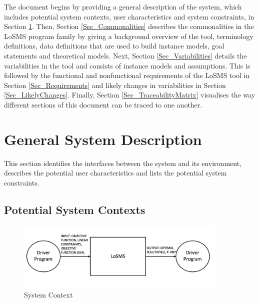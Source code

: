 \documentclass[12pt]{article}
\newcommand{\famname}{LoSMS} %
\begin{document}
The document begins by providing a general description of the system, which 
includes potential system contexts, user characteristics and system 
constraints, in Section \ref{SecSystemDescription}. Then, Section 
\ref{Sec_Commonalities} describes the commonalities in the \famname{} program 
family by giving a background overview of the tool, terminology definitions, 
data definitions that are used to build instance models, goal statements and 
theoretical models. Next, Section \ref{Sec_Variabilities} details the 
variabilities in the tool and consists of instance models and assumptions. This 
is followed by the functional and nonfunctional requirements of the \famname{} 
tool in Section \ref{Sec_Requirements} and likely changes in variabilities in 
Section \ref{Sec_LikelyChanges}. Finally, Section \ref{Sec_TraceabilityMatrix} 
visualises the way different sections of this document can be traced to one 
another. \\

\section{General System Description} \label{SecSystemDescription}

This section identifies the interfaces between the system and its environment,
describes the potential user characteristics and lists the potential system
constraints.

\subsection{Potential System Contexts}

\begin{figure}[h!]
	\begin{center}
		\includegraphics[width=0.9\textwidth, 
		height=0.20\textheight]{system-context}
		\caption{System Context}
		\label{Figure_SystemContext} 
	\end{center}
\end{figure}

\end{document}
